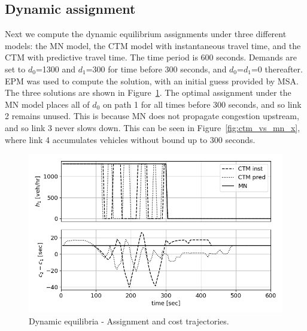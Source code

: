 
\subsection{Dynamic assignment}
Next we compute the dynamic equilibrium assignments under three different models: the MN model, the CTM model with instantaneous travel time, and the CTM with predictive travel time. The time period is 600 seconds. Demands are set to $d_0$=1300 and $d_1$=300 for time before 300 seconds, and $d_0$=$d_1$=0 thereafter. EPM was used to compute the solution, with an initial guess provided by MSA. The three solutions are shown in Figure~\ref{fig:ctm_vs_mn_hc}. The optimal assignment under the MN model places all of $d_0$ on path 1 for all times before 300 seconds, and so link 2 remains unused. This is because MN does not propagate congestion upstream, and so link 3 never slows down. This can be seen in Figure~\ref{fig:ctm_vs_mn_x}, where link 4 accumulates vehicles without bound up to 300 seconds. 
\begin{figure}[ht]
    \centering
    \includegraphics[width=0.9\linewidth]{figs/ctm_vs_mn_hc.png}
    \caption{Dynamic equilibria - Assignment and cost trajectories.}
    \label{fig:ctm_vs_mn_hc}
\end{figure}

